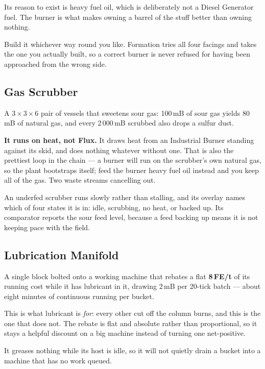 Its reason to exist is heavy fuel oil, which is deliberately not a Diesel Generator fuel. The
burner is what makes owning a barrel of the stuff better than owning nothing.

\begin{ietip}
Build it whichever way round you like. Formation tries all four facings and takes the one you
actually built, so a correct burner is never refused for having been approached from the wrong
side.
\end{ietip}

\subsection*{Gas Scrubber}

A $3\times3\times6$ pair of vessels that sweetens sour gas: 100\,mB of sour gas yields 80\,mB of
natural gas, and every 2\,000\,mB scrubbed also drops a sulfur dust.

\textbf{It runs on heat, not Flux.} It draws heat from an Industrial Burner standing against its
skid, and does nothing whatever without one. That is also the prettiest loop in the chain --- a
burner will run on the scrubber's own natural gas, so the plant bootstraps itself; feed the burner
heavy fuel oil instead and you keep all of the gas. Two waste streams cancelling out.

An underfed scrubber runs slowly rather than stalling, and its overlay names which of four states
it is in: idle, scrubbing, no heat, or backed up. Its comparator reports the sour feed level,
because a feed backing up means it is not keeping pace with the field.

\subsection*{Lubrication Manifold}

A single block bolted onto a working machine that rebates a flat \textbf{8\,FE/t} of its running
cost while it has lubricant in it, drawing 2\,mB per 20-tick batch --- about eight minutes of
continuous running per bucket.

This is what lubricant is \emph{for}: every other cut off the column burns, and this is the one
that does not. The rebate is flat and absolute rather than proportional, so it stays a helpful
discount on a big machine instead of turning one net-positive.

\begin{ietip}
It greases nothing while its host is idle, so it will not quietly drain a bucket into a machine
that has no work queued.
\end{ietip}

